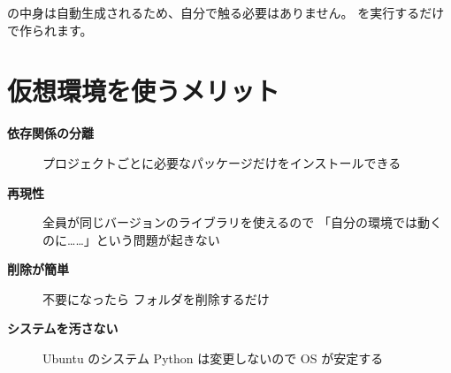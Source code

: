 \begin{tipbox}
 の中身は自動生成されるため、自分で触る必要はありません。
 を実行するだけで作られます。
\end{tipbox}

\section{仮想環境を使うメリット}

\begin{description}
  \item[\textbf{依存関係の分離}]
    プロジェクトごとに必要なパッケージだけをインストールできる
  \item[\textbf{再現性}]
    全員が同じバージョンのライブラリを使えるので
    「自分の環境では動くのに\ldots\ldots」という問題が起きない
  \item[\textbf{削除が簡単}]
    不要になったら  フォルダを削除するだけ
  \item[\textbf{システムを汚さない}]
    Ubuntu のシステム Python は変更しないので OS が安定する
\end{description}
